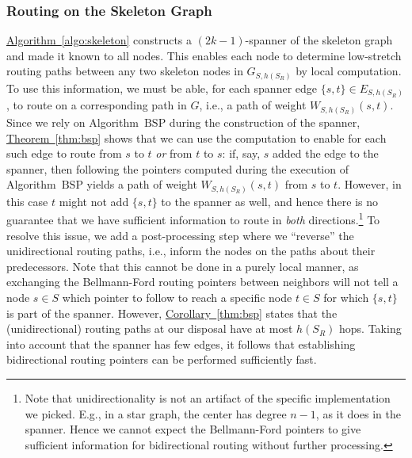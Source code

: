 \documentclass[letterpaper,11pt]{article}
\newcommand{\namedref}[2]{\hyperref[#2]{#1~\ref*{#2}}}
\newcommand{\theoremref}[1]{\namedref{Theorem}{#1}}
\newcommand{\corollaryref}[1]{\namedref{Corollary}{#1}}
\newcommand{\algref}[1]{\namedref{Algorithm}{#1}}
\newcommand{\BSP}{\mathrm{BSP}\xspace}
\begin{document}
\subsubsection*{Routing on the Skeleton Graph}

\algref{algo:skeleton} constructs a $(2k-1)$-spanner of the skeleton graph and
made it known to all nodes. This enables each node to determine low-stretch
routing paths between any two skeleton nodes in $G_{S,h(S_R)}$ by local
computation. To use this information, we must be able, for each spanner edge
$\{s,t\}\in E_{S,h(S_R)}$, to route on a corresponding path in $G$, i.e., a path
of weight $W_{S,h(S_R)}(s,t)$. Since we rely on Algorithm~$\BSP$ during the
construction of the spanner, \theoremref{thm:bsp} shows that we can use the
computation to enable for each such edge to route from $s$ to $t$ \emph{or} from
$t$ to $s$: if, say, $s$ added the edge to the spanner, then following the
pointers computed during the execution of Algorithm~$\BSP$ yields a path of
weight $W_{S,h(S_R)}(s,t)$ from $s$ to $t$. However, in this case  $t$ might not
add $\{s,t\}$ to the spanner as well, and hence there is no guarantee that we
have sufficient information to route in \emph{both} directions.\footnote{Note
that unidirectionality is not an artifact of the specific implementation we
picked. E.g., in a star graph, the center has degree $n-1$, as it does in the
spanner. Hence we cannot expect the Bellmann-Ford pointers to give sufficient
information for bidirectional routing without further processing.} To resolve
this issue, we add a post-processing step where we ``reverse'' the
unidirectional routing paths, i.e., inform the nodes on the paths about their
predecessors. Note that this cannot be done in a purely local manner, as
exchanging the Bellmann-Ford routing pointers between neighbors will not tell a
node $s\in S$ which pointer to follow to reach a specific node $t\in S$ for
which $\{s,t\}$ is part of the spanner. However, \corollaryref{thm:bsp} states
that the (unidirectional) routing paths at our disposal have at most $h(S_R)$
hops. Taking into account that the spanner has few edges, it follows that
establishing bidirectional routing pointers can be performed sufficiently fast.
\end{document}
